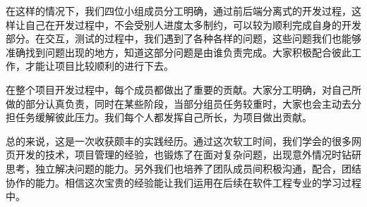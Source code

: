 在这样的情况下，我们四位小组成员分工明确，通过前后端分离式的开发过程，这样让自己在开发过程中，不会受别人进度太多制约，可以较为顺利完成自身的开发部分。在交互，测试的过程中，我们遇到了各种各样的问题，这些问题我们也能够准确找到问题出现的地方，知道这部分问题是由谁负责完成。大家积极配合彼此工作，才能让项目比较顺利的进行下去。

在整个项目开发过程中，每个成员都做出了重要的贡献。大家分工明确，对自己所做的部分认真负责，同时在某些阶段，当部分组员任务较重时，大家也会主动去分担任务缓解彼此压力。我们每个人都发挥自己所长，为项目做出贡献。

总的来说，这是一次收获颇丰的实践经历。通过这次软工时间，我们学会的很多网页开发的技术，项目管理的经验，也锻炼了在面对复杂问题，出现意外情况时钻研思考，独立解决问题的能力。另外我们也培养了团队成员间积极沟通，配合，团结协作的能力。相信这次宝贵的经验能让我们运用在后续在软件工程专业的学习过程中。

